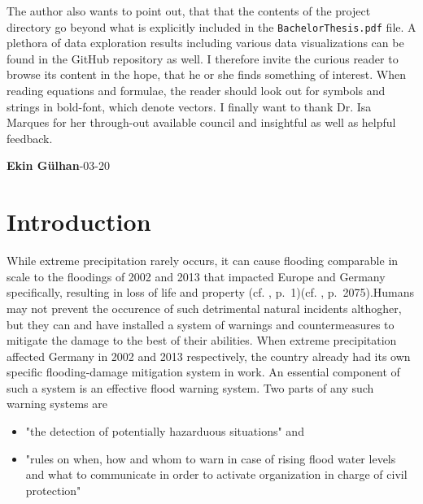 \documentclass[
  12pt,
]{article}
\begin{document}
\begin{Center}
\begin{justify}
\begin{enumerate}
\end{enumerate}
The author also wants to point out, that that the contents of the project directory go beyond what is explicitly included in the \texttt{BachelorThesis.pdf} file. A plethora of data exploration results including various data visualizations can be found in the GitHub repository as well. I therefore invite the curious reader to browse its content in the hope, that he or she finds something of interest.\newline
When reading equations and formulae, the reader should look out for symbols and strings in bold-font, which denote vectors.\newline
I finally want to thank Dr. Isa Marques for her through-out available council and insightful as well as helpful feedback. 
\end{justify}
\end{Center}

\begin{FlushRight}
\textbf{Ekin Gülhan}-03-20 
\end{FlushRight}

\newpage

\cleardoublepage
{}

\hypertarget{introduction}{%
\section{Introduction}\label{introduction}}

\begingroup
\justify

While extreme precipitation rarely occurs, it can cause flooding
comparable in scale to the floodings of 2002 and 2013 that impacted
Europe and Germany specifically, resulting in loss of life and property
(cf. \citet{Kuhlicke.2016}, p.~1)(cf. \citet{Kreibich.2017},
p.~2075).\newline Humans may not prevent the occurence of such
detrimental natural incidents althogher, but they can and have installed
a system of warnings and countermeasures to mitigate the damage to the
best of their abilities. When extreme precipitation affected Germany in
2002 and 2013 respectively, the country already had its own specific
flooding-damage mitigation system in work. An essential component of
such a system is an effective flood warning system. Two parts of any
such warning systems are

\begin{itemize}[label={}]
\item "the detection of potentially hazarduous situations" and  
\item "rules on when, how and whom to warn in case of rising flood water levels and what to communicate in order to activate organization in charge of civil protection"
\end{itemize}
\end{document}
